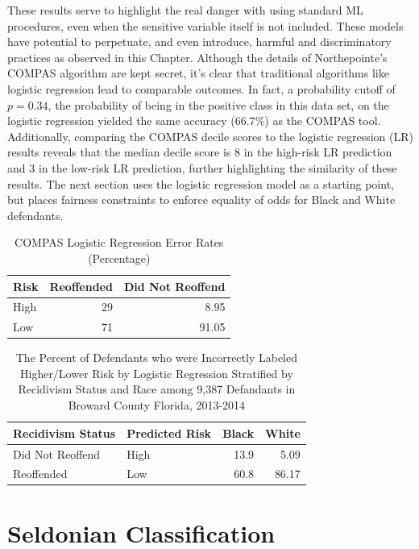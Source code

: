 \documentclass[12pt, twoside]{amherstthesis}
\begin{document}
These results serve to highlight the real danger with using standard ML procedures, even when the sensitive variable itself is not included. These models have potential to perpetuate, and even introduce, harmful and discriminatory practices as observed in this Chapter. Although the details of Northepointe's COMPAS algorithm are kept secret, it's clear that traditional algorithms like logistic regression lead to comparable outcomes. In fact, a probability cutoff of \(p = 0.34\), the probability of being in the positive class in this data set, on the logistic regression yielded the same accuracy (\(66.7\)\%) as the COMPAS tool. Additionally, comparing the COMPAS decile scores to the logistic regression (LR) results reveals that the median decile score is 8 in the high-risk LR prediction and 3 in the low-risk LR prediction, further highlighting the similarity of these results. The next section uses the logistic regression model as a starting point, but places fairness constraints to enforce equality of odds for Black and White defendants.
\begin{table}

\caption{\label{tab:ch3table3}COMPAS Logistic Regression Error Rates (Percentage)}
\centering
\begin{tabular}[t]{lrr}
\toprule
Risk & Reoffended & Did Not Reoffend\\
\midrule
High & 29 & 8.95\\
Low & 71 & 91.05\\
\bottomrule
\end{tabular}
\end{table}
\begin{table}

\caption{\label{tab:ch3table4}The Percent of Defendants who were Incorrectly Labeled Higher/Lower Risk by Logistic Regression Stratified by Recidivism Status and Race among 9,387 Defandants in Broward County Florida, 2013-2014}
\centering
\begin{tabular}[t]{llrr}
\toprule
Recidivism Status & Predicted Risk & Black & White\\
\midrule
Did Not Reoffend & High & 13.9 & 5.09\\
Reoffended & Low & 60.8 & 86.17\\
\bottomrule
\end{tabular}
\end{table}
\hypertarget{seldapp}{%
\section{Seldonian Classification}\label{seldapp}}
\end{document}
